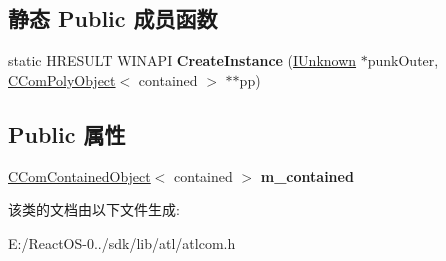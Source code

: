 \subsection*{静态 Public 成员函数}
\begin{DoxyCompactItemize}
\item 
\mbox{\label{class_a_t_l_1_1_c_com_poly_object_a636d04c4b8871b6178bcea4f3880a879}} 
static H\+R\+E\+S\+U\+LT W\+I\+N\+A\+PI {\bfseries Create\+Instance} (\hyperlink{interface_i_unknown}{I\+Unknown} $\ast$punk\+Outer, \hyperlink{class_a_t_l_1_1_c_com_poly_object}{C\+Com\+Poly\+Object}$<$ contained $>$ $\ast$$\ast$pp)
\end{DoxyCompactItemize}
\subsection*{Public 属性}
\begin{DoxyCompactItemize}
\item 
\mbox{\label{class_a_t_l_1_1_c_com_poly_object_aca84ee397f5f51c9681170dafd69e24a}} 
\hyperlink{class_a_t_l_1_1_c_com_contained_object}{C\+Com\+Contained\+Object}$<$ contained $>$ {\bfseries m\+\_\+contained}
\end{DoxyCompactItemize}


该类的文档由以下文件生成\+:\begin{DoxyCompactItemize}
\item 
E\+:/\+React\+O\+S-\/0../sdk/lib/atl/atlcom.\+h\end{DoxyCompactItemize}
